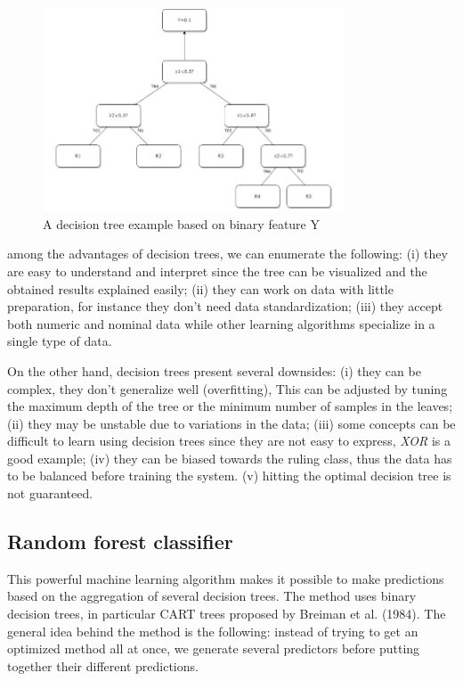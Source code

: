\documentclass[LaM,binding=0.6cm, english]{sapthesis}
\begin{document}
\begin{figure}[!ht]
    \includegraphics[width=0.8\textwidth]{images/Simple_Decision_Tree.jpg}
    \centering
    \caption{A decision tree example based on binary feature Y \cite{Song2015}}
    \label{fig:decision-tree}
\end{figure}

\par among the advantages of decision trees, we can enumerate the following: (i) they are easy to understand and interpret since the tree can be visualized and the obtained results explained easily; (ii) they can work on data with little preparation, for instance they don't need data standardization; (iii) they accept both numeric and nominal data while other learning algorithms specialize in a single type of data.

\par On the other hand, decision trees present several downsides: (i) they can be complex, they don't generalize well (overfitting), This can be adjusted by tuning the maximum depth of the tree or the minimum number of samples in the leaves; (ii) they may be unstable due to variations in the data; (iii) some concepts can be difficult to learn using decision trees since they are not easy to express, \textit{XOR} is a good example; (iv) they can be biased towards the ruling class, thus the data has to be balanced before training the system. (v) hitting the optimal decision tree is not guaranteed.

\subsection{Random forest classifier} \label{rf_model}

This powerful machine learning algorithm makes it possible to make predictions based on the aggregation of several decision trees. The method uses binary decision trees, in particular CART trees proposed by Breiman et al. (1984). The general idea behind the method is the following: instead of trying to get an optimized method all at once, we generate several predictors before putting together their different predictions.
\end{document}
